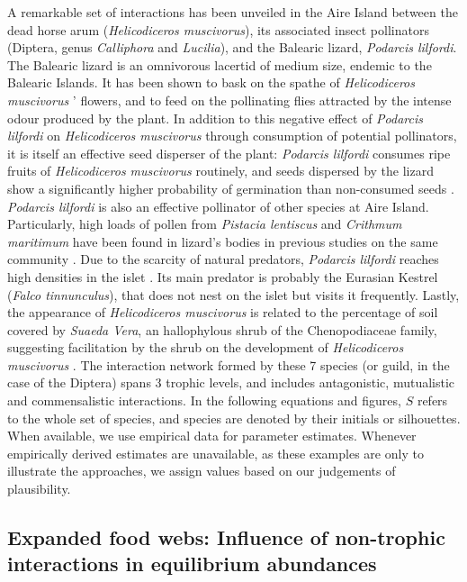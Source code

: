 A remarkable set of interactions has been unveiled in the Aire Island between the dead horse arum (\textit{Helicodiceros muscivorus}), its associated insect pollinators (Diptera, genus \textit{Calliphora} and \textit{Lucilia}), and the Balearic lizard, \textit{Podarcis lilfordi}. The Balearic lizard is an omnivorous lacertid of medium size, endemic to the Balearic Islands. It has been shown to bask on the spathe of \textit{Helicodiceros muscivorus} {}' flowers, and to feed on the pollinating flies attracted by the intense odour produced by the plant. In addition to this negative effect of \textit{Podarcis lilfordi} on \textit{Helicodiceros muscivorus} through consumption of potential pollinators, it is itself an effective seed disperser of the plant: \textit{Podarcis lilfordi} consumes ripe fruits of \textit{Helicodiceros muscivorus} routinely, and seeds dispersed by the lizard show a significantly higher probability of germination than non-consumed seeds \citep{Perez-Mellado2006}. \textit{Podarcis lilfordi} is also an effective pollinator of other species at Aire Island. Particularly, high loads of pollen from \textit{Pistacia lentiscus} and \textit{Crithmum maritimum} have been found in lizard's bodies in previous studies on the same community \citep{Perez-Mellado2000}. Due to the scarcity of natural predators, \textit{Podarcis lilfordi} reaches high densities in the islet \citep{Perez-Mellado2008}. Its main predator is probably the Eurasian Kestrel (\textit{Falco tinnunculus}), that does not nest on the islet but visits it frequently. Lastly, the appearance of \textit{Helicodiceros muscivorus} is related to the percentage of soil covered by \textit{Suaeda Vera}, an hallophylous shrub of the Chenopodiaceae family, suggesting facilitation by the shrub on the development of \textit{Helicodiceros muscivorus} \citep{Perez-Mellado2006}. The interaction network formed by these 7 species (or guild, in the case of the Diptera) spans 3 trophic levels, and includes antagonistic, mutualistic and commensalistic interactions. In the following equations and figures, $S$ refers to the whole set of species, and species are denoted by their initials or silhouettes. When available, we use empirical data for parameter estimates. Whenever empirically derived estimates are unavailable, as these examples are only to illustrate the approaches, we assign values based on our judgements of plausibility.

\subsection*{Expanded food webs: Influence of non-trophic interactions in equilibrium abundances}

